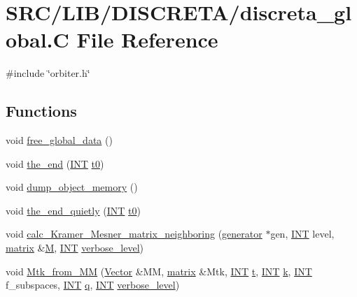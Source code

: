\hypertarget{discreta__global_8_c}{}\section{S\+R\+C/\+L\+I\+B/\+D\+I\+S\+C\+R\+E\+T\+A/discreta\+\_\+global.C File Reference}
\label{discreta__global_8_c}
{\ttfamily \#include \char`\"{}orbiter.\+h\char`\"{}}\newline
\subsection*{Functions}
\begin{DoxyCompactItemize}
\item 
void \mbox{\hyperlink{discreta__global_8_c_a6bd9eb050090f8cf1e92db88a459cc28}{free\+\_\+global\+\_\+data}} ()
\item 
void \mbox{\hyperlink{discreta__global_8_c_a3ebbd3ccb665a9f78deaa7408577b60c}{the\+\_\+end}} (\mbox{\hyperlink{galois_8h_a09fddde158a3a20bd2dcadb609de11dc}{I\+NT}} \mbox{\hyperlink{translation__plane__main_8_c_a4268f4fe222ffb119218a0199f5e1904}{t0}})
\item 
void \mbox{\hyperlink{discreta__global_8_c_a33f2d3fe7d16dd3b0ba4c484bd1e267d}{dump\+\_\+object\+\_\+memory}} ()
\item 
void \mbox{\hyperlink{discreta__global_8_c_a4a9acf1e6b9ac9542ac082d98225981a}{the\+\_\+end\+\_\+quietly}} (\mbox{\hyperlink{galois_8h_a09fddde158a3a20bd2dcadb609de11dc}{I\+NT}} \mbox{\hyperlink{translation__plane__main_8_c_a4268f4fe222ffb119218a0199f5e1904}{t0}})
\item 
void \mbox{\hyperlink{discreta__global_8_c_a6b625d682466fc26907c21e23a378cf8}{calc\+\_\+\+Kramer\+\_\+\+Mesner\+\_\+matrix\+\_\+neighboring}} (\mbox{\hyperlink{classgenerator}{generator}} $\ast$gen, \mbox{\hyperlink{galois_8h_a09fddde158a3a20bd2dcadb609de11dc}{I\+NT}} level, \mbox{\hyperlink{classmatrix}{matrix}} \&\mbox{\hyperlink{plane__search_8_c_ad2d23ebd03187a91edd45b1d5e496265}{M}}, \mbox{\hyperlink{galois_8h_a09fddde158a3a20bd2dcadb609de11dc}{I\+NT}} \mbox{\hyperlink{simeon_8_c_a818073fbcc2f439e7c56952f67386122}{verbose\+\_\+level}})
\item 
void \mbox{\hyperlink{discreta__global_8_c_afeecbc8a2b22f56f2148e646622f0c1e}{Mtk\+\_\+from\+\_\+\+MM}} (\mbox{\hyperlink{class_vector}{Vector}} \&MM, \mbox{\hyperlink{classmatrix}{matrix}} \&Mtk, \mbox{\hyperlink{galois_8h_a09fddde158a3a20bd2dcadb609de11dc}{I\+NT}} \mbox{\hyperlink{alphabet2_8_c_ac310d9181e916ba43604099aee272c71}{t}}, \mbox{\hyperlink{galois_8h_a09fddde158a3a20bd2dcadb609de11dc}{I\+NT}} \mbox{\hyperlink{simeon_8_c_a43fa990200c3ddd47c35f151bd4d66bf}{k}}, \mbox{\hyperlink{galois_8h_a09fddde158a3a20bd2dcadb609de11dc}{I\+NT}} f\+\_\+subspaces, \mbox{\hyperlink{galois_8h_a09fddde158a3a20bd2dcadb609de11dc}{I\+NT}} \mbox{\hyperlink{simeon_8_c_a92cbb483a3b27ae1a0dbfcb125ce216f}{q}}, \mbox{\hyperlink{galois_8h_a09fddde158a3a20bd2dcadb609de11dc}{I\+NT}} \mbox{\hyperlink{simeon_8_c_a818073fbcc2f439e7c56952f67386122}{verbose\+\_\+level}})

\end{DoxyCompactItemize}
